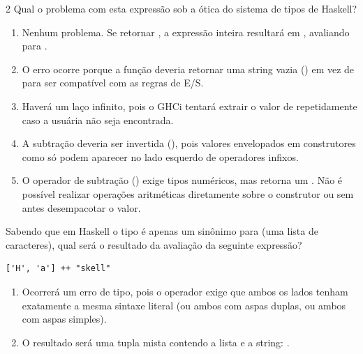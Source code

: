 \documentclass[a4paper,10pt,brazil]{article}
\begin{document}
\begin{multicols}{2}
Qual o problema com esta expressão sob a ótica do sistema de tipos de Haskell?

\begin{enumerate}
  \item Nenhum problema. Se  retornar , a expressão inteira resultará em , avaliando para .

  \item O erro ocorre porque a função  deveria retornar uma string vazia () em vez de  para ser compatível com as regras de E/S.

  \item Haverá um laço infinito, pois o GHCi tentará extrair o valor de  repetidamente caso a usuária não seja encontrada.

  \item A subtração deveria ser invertida (), pois valores envelopados em construtores como  só podem aparecer no lado esquerdo de operadores infixos.

  \item O operador de subtração (\haskellinline{-}) exige tipos numéricos, mas  retorna um . Não é possível realizar operações aritméticas diretamente sobre o construtor  ou  sem antes desempacotar o valor.


\end{enumerate}

Sabendo que em Haskell o tipo  é apenas um sinônimo para \haskellinline{[Char]} (uma lista de caracteres), qual será o resultado da avaliação da seguinte expressão?
\begin{verbatim}
['H', 'a'] ++ "skell"
\end{verbatim}

\begin{enumerate}
  \item Ocorrerá um erro de tipo, pois o operador \haskellinline{++} exige que ambos os lados tenham exatamente a mesma sintaxe literal (ou ambos com aspas duplas, ou ambos com aspas simples).

  \item O resultado será uma tupla mista contendo a lista e a string: .


\end{enumerate}
\end{multicols}
\end{document}

